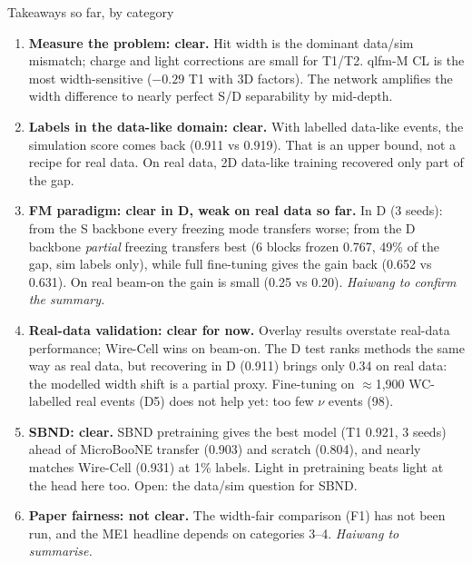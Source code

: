 \documentclass[aspectratio=169,10pt]{beamer}
\begin{document}
\begin{frame}{Takeaways so far, by category}
  \footnotesize
  \begin{enumerate}\setlength{\itemsep}{4pt}
    \item \textbf{Measure the problem: clear.} Hit width is the dominant data/sim mismatch; charge and light corrections are small for T1/T2. qlfm-M CL is the most width-sensitive ($-0.29$ T1 with 3D factors). The network amplifies the width difference to nearly perfect S/D separability by mid-depth.
    \item \textbf{Labels in the data-like domain: clear.} With labelled data-like events, the simulation score comes back (0.911 vs 0.919). That is an upper bound, not a recipe for real data. On real data, 2D data-like training recovered only part of the gap.
    \item \textbf{FM paradigm: clear in D, weak on real data so far.} In D (3 seeds): from the S backbone every freezing mode transfers worse; from the D backbone \emph{partial} freezing transfers best (6 blocks frozen 0.767, 49\% of the gap, sim labels only), while full fine-tuning gives the gain back (0.652 vs 0.631). On real beam-on the gain is small (0.25 vs 0.20). \textit{Haiwang to confirm the summary.}
    \item \textbf{Real-data validation: clear for now.} Overlay results overstate real-data performance; Wire-Cell wins on beam-on. The D test ranks methods the same way as real data, but recovering in D (0.911) brings only 0.34 on real data: the modelled width shift is a partial proxy. Fine-tuning on $\approx$1,900 WC-labelled real events (D5) does not help yet: too few $\nu$ events (98).
    \item \textbf{SBND: clear.} SBND pretraining gives the best model (T1 0.921, 3 seeds) ahead of MicroBooNE transfer (0.903) and scratch (0.804), and nearly matches Wire-Cell (0.931) at 1\% labels. Light in pretraining beats light at the head here too. Open: the data/sim question for SBND.
    \item \textbf{Paper fairness: not clear.} The width-fair comparison (F1) has not been run, and the ME1 headline depends on categories 3--4. \textit{Haiwang to summarise.}
  \end{enumerate}
\end{frame}
\end{document}
